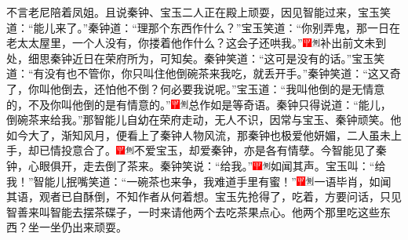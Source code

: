 不言老尼陪着凤姐。且说秦钟、宝玉二人正在殿上顽耍，因见智能过来，宝玉笑道：“能儿来了。”秦钟道：“理那个东西作什么？”宝玉笑道：“你别弄鬼，那一日在老太太屋里，一个人没有，你搂着他作什么？这会子还哄我。”{\includegraphics[width=3mm]{../Images/00002}\includegraphics[width=3mm]{../Images/00011}\footnotesize \kaishu 补出前文未到处，细思秦钟近日在荣府所为，可知矣。}秦钟笑道：“这可是没有的话。”宝玉笑道：“有没有也不管你，你只叫住他倒碗茶来我吃，就丢开手。”秦钟笑道：“这又奇了，你叫他倒去，还怕他不倒？何必要我说呢。”宝玉道：“我叫他倒的是无情意的，不及你叫他倒的是有情意的。”{\includegraphics[width=3mm]{../Images/00002}\includegraphics[width=3mm]{../Images/00011}\footnotesize \kaishu 总作如是等奇语。}秦钟只得说道：“能儿，倒碗茶来给我。”那智能儿自幼在荣府走动，无人不识，因常与宝玉、秦钟顽笑。他如今大了，渐知风月，便看上了秦钟人物风流，那秦钟也极爱他妍媚，二人虽未上手，却已情投意合了。{\includegraphics[width=3mm]{../Images/00002}\includegraphics[width=3mm]{../Images/00011}\footnotesize \kaishu 不爱宝玉，却爱秦钟，亦是各有情孽。}今智能见了秦钟，心眼俱开，走去倒了茶来。秦钟笑说：“给我。”{\includegraphics[width=3mm]{../Images/00002}\includegraphics[width=3mm]{../Images/00011}\footnotesize \kaishu 如闻其声。}宝玉叫：“给我！”智能儿抿嘴笑道：“一碗茶也来争，我难道手里有蜜！”{\includegraphics[width=3mm]{../Images/00002}\includegraphics[width=3mm]{../Images/00011}\footnotesize \kaishu 一语毕肖，如闻其语，观者已自酥倒，不知作者从何着想。}宝玉先抢得了，吃着，方要问话，只见智善来叫智能去摆茶碟子，一时来请他两个去吃茶果点心。他两个那里吃这些东西？坐一坐仍出来顽耍。

